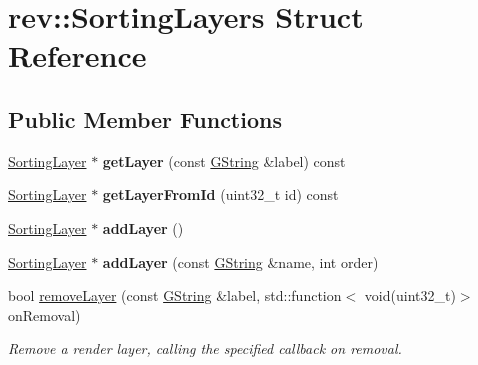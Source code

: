\hypertarget{structrev_1_1_sorting_layers}{}\section{rev\+::Sorting\+Layers Struct Reference}
\label{structrev_1_1_sorting_layers}
\subsection*{Public Member Functions}
\begin{DoxyCompactItemize}
\item 
\mbox{\label{structrev_1_1_sorting_layers_a97f14ab1284c9522b76b0c566a923cfe}} 
\mbox{\hyperlink{structrev_1_1_sorting_layer}{Sorting\+Layer}} $\ast$ {\bfseries get\+Layer} (const \mbox{\hyperlink{classrev_1_1_g_string}{G\+String}} \&label) const
\item 
\mbox{\label{structrev_1_1_sorting_layers_aa7e392d5267e1fcd8fa6482fad2346ff}} 
\mbox{\hyperlink{structrev_1_1_sorting_layer}{Sorting\+Layer}} $\ast$ {\bfseries get\+Layer\+From\+Id} (uint32\+\_\+t id) const
\item 
\mbox{\label{structrev_1_1_sorting_layers_a62124f27902a14e9d8491dc9a95548ca}} 
\mbox{\hyperlink{structrev_1_1_sorting_layer}{Sorting\+Layer}} $\ast$ {\bfseries add\+Layer} ()
\item 
\mbox{\label{structrev_1_1_sorting_layers_a960f15159157f8ce072b4e6ba9e9a51e}} 
\mbox{\hyperlink{structrev_1_1_sorting_layer}{Sorting\+Layer}} $\ast$ {\bfseries add\+Layer} (const \mbox{\hyperlink{classrev_1_1_g_string}{G\+String}} \&name, int order)
\item 
\mbox{\label{structrev_1_1_sorting_layers_aab133691a73bf845c9d7a1d000603b5d}} 
bool \mbox{\hyperlink{structrev_1_1_sorting_layers_aab133691a73bf845c9d7a1d000603b5d}{remove\+Layer}} (const \mbox{\hyperlink{classrev_1_1_g_string}{G\+String}} \&label, std\+::function$<$ void(uint32\+\_\+t)$>$ on\+Removal)
\begin{DoxyCompactList}\small\item\em Remove a render layer, calling the specified callback on removal. \end{DoxyCompactList}\item 

\end{DoxyCompactItemize}
